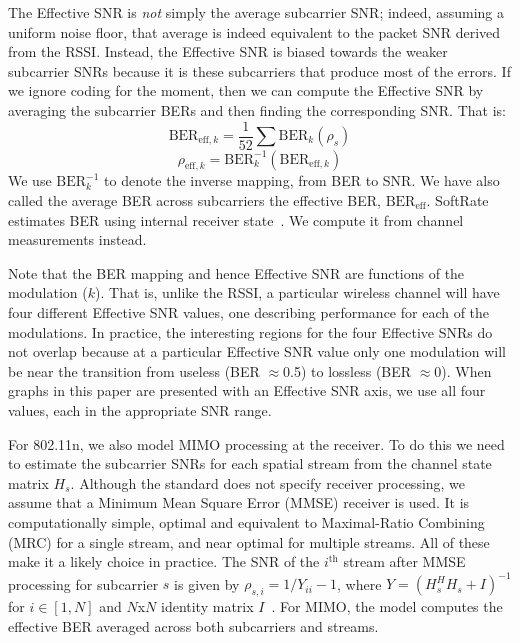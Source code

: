 The Effective SNR is \emph{not} simply the average subcarrier SNR; indeed, assuming a uniform noise floor, that average is indeed equivalent to the packet SNR derived from the RSSI\@. Instead, the Effective SNR is biased towards the weaker subcarrier SNRs because it is these subcarriers that produce most of the errors. If we ignore coding for the moment, then we can compute the Effective SNR by averaging the subcarrier BERs and then finding the corresponding SNR\@. That is:
\begin{equation}
\label{eq:effective_ber}
	\text{BER}_{\text{eff},k} = \frac{1}{52} \sum \text{BER}_k(\rho_s)
\end{equation}
\begin{equation}
\label{eq:effective_snr}
	\rho_{\text{eff},k} = \text{BER}_k^{-1}(\text{BER}_{\text{eff},k})
\end{equation}
We use $\text{BER}_k^{-1}$ to denote the inverse mapping, from BER to SNR\@. We have also called the average BER across subcarriers the effective BER, $\text{BER}_{\text{eff}}$. SoftRate estimates BER using internal receiver state~\cite{Vutukuru_SoftRate}. We compute it from channel measurements instead.

Note that the BER mapping and hence Effective SNR are functions of the modulation ($k$). That is, unlike the RSSI, a particular wireless channel will have four different Effective SNR values, one describing performance for each of the modulations. In practice, the interesting regions for the four Effective SNRs do not overlap because at a particular Effective SNR value only one modulation will be near the transition from useless (BER $\approx$0.5) to lossless (BER $\approx$0). When graphs in this paper are presented with an Effective SNR axis, we use all four values, each in the appropriate SNR range.

For 802.11n, we also model MIMO processing at the receiver. To do this we need to estimate the subcarrier SNRs for each spatial stream from the channel state matrix $H_s$. Although the standard does not specify receiver processing, 
we assume that a Minimum Mean Square Error (MMSE) receiver is used. It is computationally simple, optimal and equivalent to Maximal-Ratio Combining (MRC) for a single stream, and near optimal for multiple streams. 
All of these make it a likely choice in practice.
The SNR of the $i^{\text{th}}$ stream after MMSE processing for subcarrier $s$ is 
given by $\rho_{s,i} = 1/Y_{ii}-1$, where
	$Y = \left(H_s^H H_s+I\right)^{-1}$
for $i \in [1,N]$ and $N$x$N$ identity matrix $I$~\cite{Tse}. For MIMO, the model computes the effective BER averaged across both subcarriers and streams.

